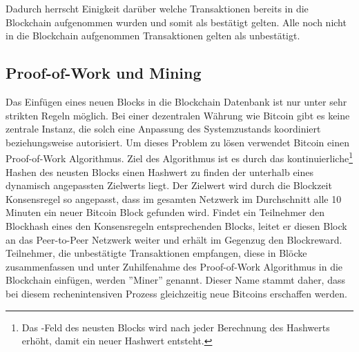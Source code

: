 \if Dadurch herrscht Einigkeit darüber welche Transaktionen bereits in die Blockchain aufgenommen wurden und somit als bestätigt gelten. Alle noch nicht in die Blockchain aufgenommen Transaktionen gelten als unbestätigt. \fi

\subsection{Proof-of-Work und Mining}
Das Einfügen eines neuen Blocks in die Blockchain Datenbank ist nur unter sehr strikten Regeln möglich. Bei einer dezentralen Währung wie Bitcoin gibt es keine zentrale Instanz, die solch eine Anpassung des Systemzustands koordiniert beziehungsweise autorisiert. Um dieses Problem zu lösen verwendet Bitcoin einen Proof-of-Work Algorithmus. Ziel des Algorithmus ist es durch das kontinuierliche\footnote{Das -Feld des neusten Blocks wird nach jeder Berechnung des Hashwerts erhöht, damit ein neuer Hashwert entsteht.} Hashen des neusten Blocks einen Hashwert zu finden der unterhalb eines dynamisch angepassten Zielwerts liegt. Der Zielwert wird durch die Blockzeit Konsensregel so angepasst, dass im gesamten Netzwerk im Durchschnitt alle 10 Minuten ein neuer Bitcoin Block gefunden wird. Findet ein Teilnehmer den Blockhash eines den Konsensregeln entsprechenden Blocks, leitet er diesen Block an das Peer-to-Peer Netzwerk weiter und erhält im Gegenzug den Blockreward. Teilnehmer, die unbestätigte Transaktionen empfangen, diese in Blöcke zusammenfassen und unter Zuhilfenahme des Proof-of-Work Algorithmus in die Blockchain einfügen, werden ''Miner'' genannt. Dieser Name stammt daher, dass bei diesem rechenintensiven Prozess gleichzeitig neue Bitcoins erschaffen werden.

